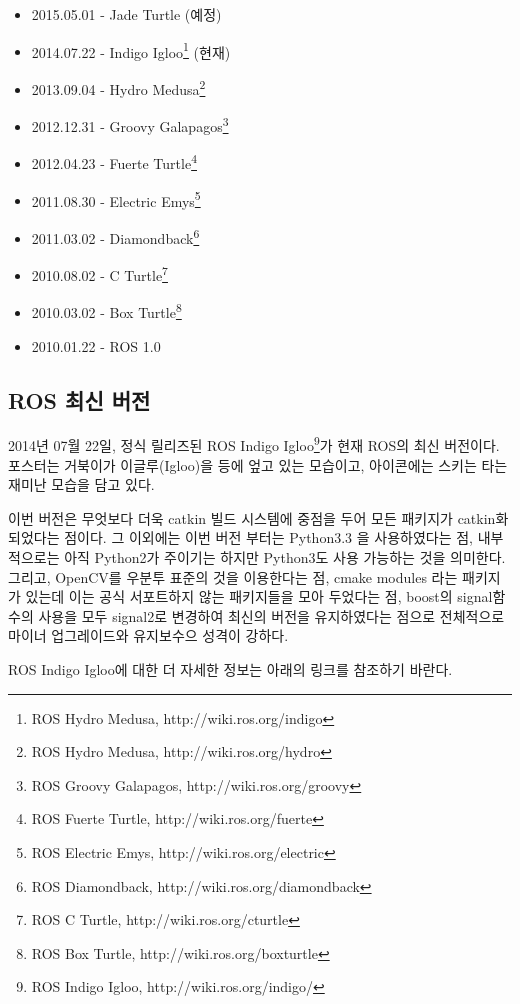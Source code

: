 \begin{itemize}
\item 2015.05.01 - Jade Turtle (예정)
\item 2014.07.22 - Indigo Igloo\footnote{ROS Hydro Medusa, http://wiki.ros.org/indigo} (현재)
\item 2013.09.04 - Hydro Medusa\footnote{ROS Hydro Medusa, http://wiki.ros.org/hydro}
\item 2012.12.31 - Groovy Galapagos\footnote{ROS Groovy Galapagos, http://wiki.ros.org/groovy}
\item 2012.04.23 - Fuerte Turtle\footnote{ROS Fuerte Turtle, http://wiki.ros.org/fuerte}
\item 2011.08.30 - Electric Emys\footnote{ROS Electric Emys, http://wiki.ros.org/electric}
\item 2011.03.02 - Diamondback\footnote{ROS Diamondback, http://wiki.ros.org/diamondback}
\item 2010.08.02 - C Turtle\footnote{ROS C Turtle, http://wiki.ros.org/cturtle}
\item 2010.03.02 - Box Turtle\footnote{ROS Box Turtle, http://wiki.ros.org/boxturtle}
\item 2010.01.22 - ROS 1.0
\end{itemize}

\subsection{ROS 최신 버전}

2014년 07월 22일, 정식 릴리즈된 ROS Indigo Igloo\footnote{ROS Indigo Igloo, http://wiki.ros.org/indigo/}가 현재 ROS의 최신 버전이다. 포스터는 거북이가 이글루(Igloo)을 등에 엎고 있는 모습이고, 아이콘에는 스키는 타는 재미난 모습을 담고 있다.

이번 버전은 무엇보다 더욱 catkin 빌드 시스템에 중점을 두어 모든 패키지가 catkin화 되었다는 점이다. 그 이외에는 이번 버전 부터는 Python3.3 을 사용하였다는 점, 내부적으로는 아직 Python2가 주이기는 하지만 Python3도 사용 가능하는 것을 의미한다. 그리고, OpenCV를 우분투 표준의 것을 이용한다는 점, cmake modules 라는 패키지가 있는데 이는 공식 서포트하지 않는 패키지들을 모아 두었다는 점, boost의 signal함수의 사용을 모두 signal2로 변경하여 최신의 버전을 유지하였다는 점으로 전체적으로 마이너 업그레이드와 유지보수으 성격이 강하다.

ROS Indigo Igloo에 대한 더 자세한 정보는 아래의 링크를 참조하기 바란다.

